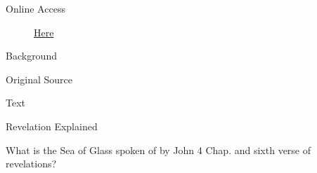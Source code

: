 			\begin{description}
				\item[Online Access] \href{https://www.josephsmithpapers.org/paper-summary/answers-to-questions-between-circa-4-and-circa-20-march-1832-dc-77/1}{Here}
			\end{description}
			
			\begin{description}
				\item[Background]
			\end{description}
			
			
			\begin{description}
				\item[Original Source]
			\end{description}
			
			
			\begin{description}
				\item[Text]
			\end{description}
			
				\begin{tightcenter}
				Revelation Explained
				\end{tightcenter}
				
				What is the Sea of Glass spoken of by John 4 Chap. and sixth verse of revelations?
				
